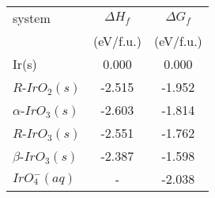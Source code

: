 \begin{tabular}{lcc}
\toprule
                system & $\Delta H_{f}$ & $\Delta G_{f}$ \\
                       &      (eV/f.u.) &      (eV/f.u.) \\
\midrule
                 Ir(s) &          0.000 &          0.000 \\
      $R$-$IrO_{2}(s)$ &         -2.515 &         -1.952 \\
 $\alpha$-$IrO_{3}(s)$ &         -2.603 &         -1.814 \\
      $R$-$IrO_{3}(s)$ &         -2.551 &         -1.762 \\
  $\beta$-$IrO_{3}(s)$ &         -2.387 &         -1.598 \\
     $IrO_{4}^{-}(aq)$ &              - &         -2.038 \\
\bottomrule
\end{tabular}
